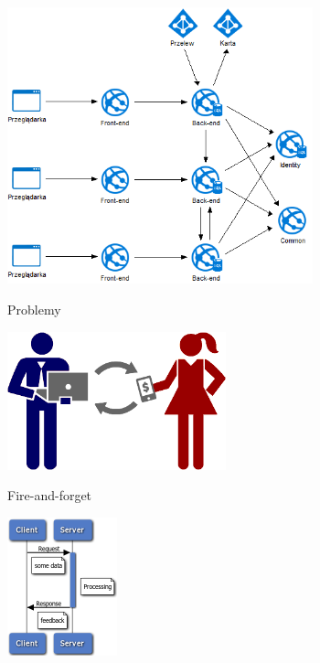 \documentclass{beamer}
\begin{document}
\begin{frame}{}
	\begin{center}
		\includegraphics[height=8cm]{architektura3.png}
	\end{center}
\end{frame}

\begin{frame}{}
	\begin{center}
		\Huge{Problemy}
	\end{center}
\end{frame}

\begin{frame}{}
	\begin{center}
		\includegraphics[height=4cm]{pay1.png}
	\end{center}
\end{frame}

\begin{frame}{}
	\begin{center}
		\Huge{Fire-and-forget}
	\end{center}
\end{frame}

\begin{frame}{}
	\begin{center}
		\includegraphics[height=4cm]{async1.png}
	\end{center}
\end{frame}
\end{document}
